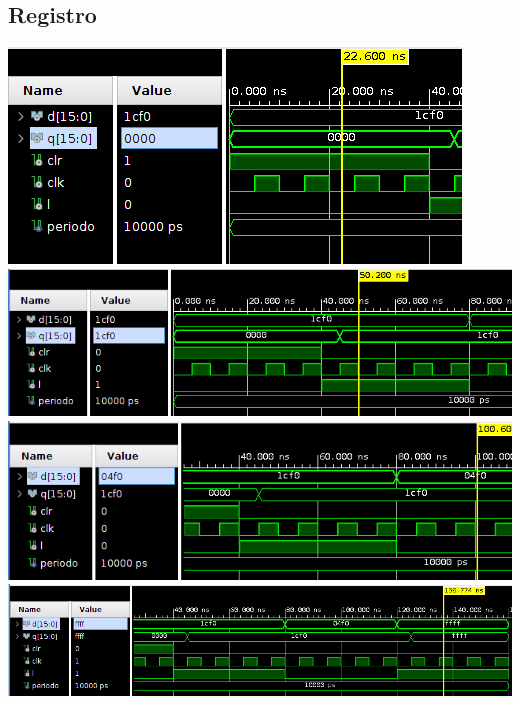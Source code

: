 \documentclass[8pt,executivepaper]{article}
\begin{document}
\subsection{Registro}
\begin{center}
  \includegraphics[scale=0.5]{imgs/uno.png}\\
  \includegraphics[scale=0.5]{imgs/dos.png}\\
  \includegraphics[scale=0.5]{imgs/tres.png}\\
  \includegraphics[scale=0.5]{imgs/cuatro.png}\\
\end{center}
\end{document}
